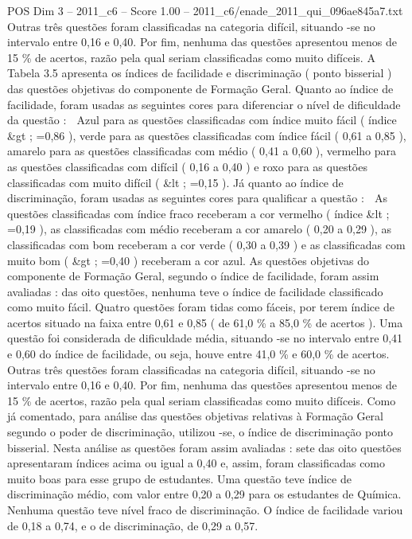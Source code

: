 \begin{textsample}{POS Dim 3 – 2011\_c6 – Score 1.00 – 2011\_c6/enade\_2011\_qui\_096ae845a7.txt}
Outras três questões foram classificadas na categoria difícil, situando -se no intervalo entre 0,16 e 0,40.
Por fim, nenhuma das questões apresentou menos de 15 \% de acertos, razão pela qual seriam classificadas como muito difíceis.
A Tabela 3.5 apresenta os índices de facilidade e discriminação ( ponto bisserial ) das questões objetivas do componente de Formação Geral.
Quanto ao índice de facilidade, foram usadas as seguintes cores para diferenciar o nível de dificuldade da questão :  Azul para as questões classificadas com índice muito fácil ( índice \&gt ; =0,86 ), verde para as questões classificadas com índice fácil ( 0,61 a 0,85 ), amarelo para as questões classificadas com médio ( 0,41 a 0,60 ), vermelho para as questões classificadas com difícil ( 0,16 a 0,40 ) e roxo para as questões classificadas com muito difícil ( \&lt ; =0,15 ).
Já quanto ao índice de discriminação, foram usadas as seguintes cores para qualificar a questão :  As questões classificadas com índice fraco receberam a cor vermelho ( índice \&lt ; =0,19 ), as classificadas com médio receberam a cor amarelo ( 0,20 a 0,29 ), as classificadas com bom receberam a cor verde ( 0,30 a 0,39 ) e as classificadas com muito bom ( \&gt ; =0,40 ) receberam a cor azul.
As questões objetivas do componente de Formação Geral, segundo o índice de facilidade, foram assim avaliadas : das oito questões, nenhuma teve o índice de facilidade classificado como muito fácil.
Quatro questões foram tidas como fáceis, por terem índice de acertos situado na faixa entre 0,61 e 0,85 ( de 61,0 \% a 85,0 \% de acertos ).
Uma questão foi considerada de dificuldade média, situando -se no intervalo entre 0,41 e 0,60 do índice de facilidade, ou seja, houve entre 41,0 \% e 60,0 \% de acertos.
Outras três questões foram classificadas na categoria difícil, situando -se no intervalo entre 0,16 e 0,40.
Por fim, nenhuma das questões apresentou menos de 15 \% de acertos, razão pela qual seriam classificadas como muito difíceis.
Como já comentado, para análise das questões objetivas relativas à Formação Geral segundo o poder de discriminação, utilizou -se, o índice de discriminação ponto bisserial.
Nesta análise as questões foram assim avaliadas : sete das oito questões apresentaram índices acima ou igual a 0,40 e, assim, foram classificadas como muito boas para esse grupo de estudantes.
Uma questão teve índice de discriminação médio, com valor entre 0,20 a 0,29 para os estudantes de Química.
Nenhuma questão teve nível fraco de discriminação.
O índice de facilidade variou de 0,18 a 0,74, e o de discriminação, de 0,29 a 0,57.

\end{textsample}
